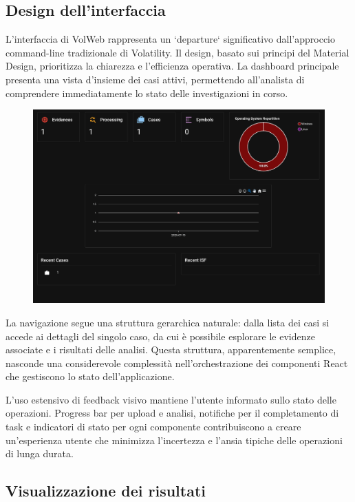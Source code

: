 \subsection{Design dell'interfaccia}

L'interfaccia di VolWeb rappresenta un `departure` significativo dall'approccio command-line tradizionale di Volatility. Il design, basato sui principi del Material Design, prioritizza la chiarezza e l'efficienza operativa. La dashboard principale presenta una vista d'insieme dei casi attivi, permettendo all'analista di comprendere immediatamente lo stato delle investigazioni in corso.

\begin{figure}[H]
    \centering
    \includegraphics[width=1\linewidth]{images/volweb-original/volweb-dashboard.png}
\end{figure}

La navigazione segue una struttura gerarchica naturale: dalla lista dei casi si accede ai dettagli del singolo caso, da cui è possibile esplorare le evidenze associate e i risultati delle analisi. Questa struttura, apparentemente semplice, nasconde una considerevole complessità nell'orchestrazione dei componenti React che gestiscono lo stato dell'applicazione.

L'uso estensivo di feedback visivo mantiene l'utente informato sullo stato delle operazioni. Progress bar per upload e analisi, notifiche per il completamento di task e indicatori di stato per ogni componente contribuiscono a creare un'esperienza utente che minimizza l'incertezza e l'ansia tipiche delle operazioni di lunga durata.

\subsection{Visualizzazione dei risultati}

